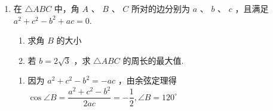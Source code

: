 \begin{enumerate}
\begin{enumerate}
\begin{jieda}
\begin{enumerate}
            则 $S = \dfrac{1}{2}{bc}\sin A = \dfrac{1}{4}{bc} \leq  2 + \sqrt{3}$ .
            因此,当 $b$ 为 $\sqrt{2} + \sqrt{6}$ 时, ${S}_{\bigtriangleup {ABC}}$ 取得最大值 $2 + \sqrt{3}$ .
        \end{enumerate}
    \end{jieda}
    \item 在 $\bigtriangleup {ABC}$ 中，角 $A$ 、 $B$ 、 $C$ 所对的边分别为 $a$ 、 $b$ 、 $c$ ，且满足 ${a}^{2} + {c}^{2} - {b}^{2} +  {ac} = 0.$
    \begin{enumerate}
        \item 求角 $B$ 的大小
        \item 若 $b = 2\sqrt{3}$ ，求 $\bigtriangleup  {ABC}$ 的周长的最大值.
    \end{enumerate}
    \begin{jieda}
        \begin{enumerate}
            \item 因为 ${a}^{2} + {c}^{2} - {b}^{2} =  - {ac}$ ，由余弦定理得 $\cos \angle B =  \dfrac{{a}^{2} + {c}^{2} - {b}^{2}}{2ac} =  - \dfrac{1}{2},\angle B = {120}^{ \circ  }$
            

\end{enumerate}
\end{jieda}
\end{enumerate}
\end{enumerate}
